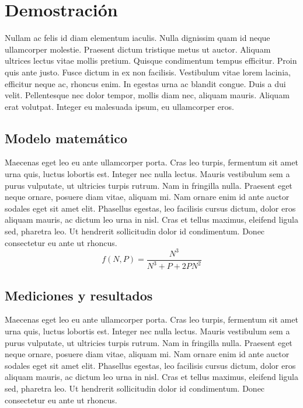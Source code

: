 \documentclass[10pt,twocolumn,a4paper]{article}
\begin{document}
\section{Demostración}
Nullam ac felis id diam elementum iaculis. Nulla dignissim quam id neque ullamcorper molestie. Praesent dictum tristique metus ut auctor. Aliquam ultrices lectus vitae mollis pretium. Quisque condimentum tempus efficitur. Proin quis ante justo. Fusce dictum in ex non facilisis. Vestibulum vitae lorem lacinia, efficitur neque ac, rhoncus enim. In egestas urna ac blandit congue. Duis a dui velit. Pellentesque nec dolor tempor, mollis diam nec, aliquam mauris. Aliquam erat volutpat. Integer eu malesuada ipsum, eu ullamcorper eros.


\subsection{Modelo matemático}
Maecenas eget leo eu \cite{Almeida2008}ante ullamcorper porta. Cras leo turpis, fermentum sit amet urna quis, luctus lobortis est. Integer nec nulla lectus. Mauris vestibulum sem a purus vulputate, ut ultricies turpis rutrum. Nam in fringilla nulla. Praesent eget neque ornare, posuere diam vitae, aliquam mi. Nam ornare enim id ante auctor sodales eget sit amet elit. Phasellus egestas, leo facilisis cursus dictum, dolor eros aliquam mauris, ac dictum leo urna in nisl. Cras et tellus maximus, eleifend ligula sed, pharetra leo. Ut hendrerit sollicitudin dolor id condimentum. Donec consectetur eu ante ut rhoncus.
\begin{equation}
	f(N,P) = \frac{N^{3}}{N^{3} + P + 2PN^{2}}
\end{equation}

\subsection{Mediciones y resultados}

Maecenas eget leo eu ante ullamcorper porta. Cras leo turpis, fermentum sit amet urna quis, luctus lobortis est. Integer nec nulla lectus. Mauris vestibulum sem a purus vulputate, ut ultricies turpis rutrum. Nam in fringilla nulla. Praesent eget neque ornare, posuere diam vitae, aliquam mi. Nam ornare enim id ante auctor sodales eget sit amet elit. Phasellus egestas, leo facilisis cursus dictum, dolor eros aliquam mauris, ac dictum leo urna in nisl. Cras et tellus maximus, eleifend ligula sed, pharetra leo. Ut hendrerit sollicitudin dolor id condimentum. Donec consectetur eu ante ut rhoncus.
\end{document}
